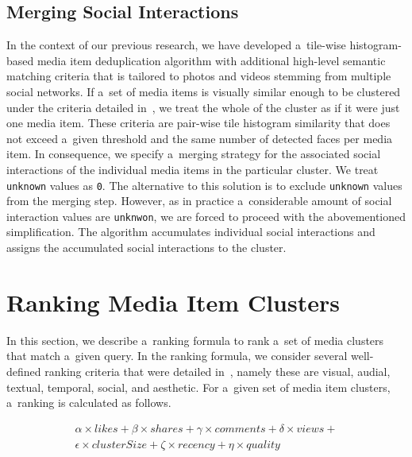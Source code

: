 \documentclass{sig-alt-release2}
\begin{document}
\subsection{Merging Social Interactions}
\label{sec:merging-social-interactions}

In the context of our previous research,
we have developed a~tile-wise histogram-based
media item deduplication algorithm
with additional high-level semantic matching criteria
that is tailored to photos and videos stemming from multiple social networks.
If a~set of media items is visually similar enough to be clustered
under the criteria detailed in~\cite{rizzo2012whatfresh},
we treat the whole of the cluster
as if it were just one media item.
These criteria are pair-wise tile histogram similarity 
that does not exceed a~given threshold
and the same number of detected faces per media item.
In consequence, we specify a~merging strategy
for the associated social interactions of the individual media items
in the particular cluster.
We treat \texttt{unknown} values as \texttt{0}.
The alternative to this solution is to exclude \texttt{unknown} values
from the merging step.
However, as in practice a~considerable amount of
social interaction values are \texttt{unknwon},
we are forced to proceed with the abovementioned simplification.
The algorithm accumulates individual social interactions
and assigns the accumulated social interactions to the cluster.

\section{Ranking Media Item Clusters}

In this section, we describe a~ranking formula to rank
a~set of media clusters that match a~given query.
In the ranking formula, we consider several well-defined ranking criteria
that were detailed in~\cite{steiner2012definingaesthetic},
namely these are visual, audial, textual, temporal, social, and aesthetic.
For a~given set of media item clusters, a~ranking is calculated as follows.

\begin{gather}
  \alpha \times \mathit{likes} + \beta \times \mathit{shares} +
  \gamma \times \mathit{comments} + \delta \times \mathit{views} + \nonumber\\
  \epsilon \times \mathit{clusterSize} + \zeta \times \mathit{recency} +
  \eta \times \mathit{quality}
\end{gather}
\end{document}
